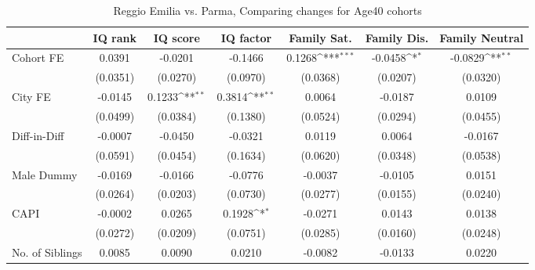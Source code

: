 \begin{table}[htbp]\centering
\def\sym#1{\ifmmode^{#1}\else\(^{#1}\)\fi}
\caption{Reggio Emilia vs. Parma, Comparing changes for Age40 cohorts}
\begin{tabular}{l*{6}{c}}
\toprule
            &\multicolumn{1}{c}{IQ rank}&\multicolumn{1}{c}{IQ score}&\multicolumn{1}{c}{IQ factor}&\multicolumn{1}{c}{Family Sat.}&\multicolumn{1}{c}{Family Dis.}&\multicolumn{1}{c}{Family Neutral}\\
\midrule
Cohort FE   &      0.0391         &     -0.0201         &     -0.1466         &      0.1268\sym{***}&     -0.0458\sym{*}  &     -0.0829\sym{**} \\
            &    (0.0351)         &    (0.0270)         &    (0.0970)         &    (0.0368)         &    (0.0207)         &    (0.0320)         \\
\addlinespace
City FE     &     -0.0145         &      0.1233\sym{**} &      0.3814\sym{**} &      0.0064         &     -0.0187         &      0.0109         \\
            &    (0.0499)         &    (0.0384)         &    (0.1380)         &    (0.0524)         &    (0.0294)         &    (0.0455)         \\
\addlinespace
Diff-in-Diff&     -0.0007         &     -0.0450         &     -0.0321         &      0.0119         &      0.0064         &     -0.0167         \\
            &    (0.0591)         &    (0.0454)         &    (0.1634)         &    (0.0620)         &    (0.0348)         &    (0.0538)         \\
\addlinespace
Male Dummy  &     -0.0169         &     -0.0166         &     -0.0776         &     -0.0037         &     -0.0105         &      0.0151         \\
            &    (0.0264)         &    (0.0203)         &    (0.0730)         &    (0.0277)         &    (0.0155)         &    (0.0240)         \\
\addlinespace
CAPI        &     -0.0002         &      0.0265         &      0.1928\sym{*}  &     -0.0271         &      0.0143         &      0.0138         \\
            &    (0.0272)         &    (0.0209)         &    (0.0751)         &    (0.0285)         &    (0.0160)         &    (0.0248)         \\
\addlinespace
No. of Siblings&      0.0085         &      0.0090         &      0.0210         &     -0.0082         &     -0.0133         &      0.0220         \\

\end{tabular}
\end{table}
